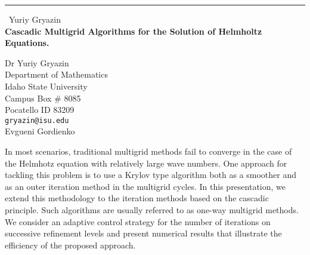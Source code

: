 \documentclass{report}
\begin{document}
\begin{center}
\rule{6in}{1pt} \
{\large Yuriy Gryazin \\
{\bf Cascadic Multigrid Algorithms for the Solution of Helmholtz Equations.}}

Dr Yuriy Gryazin \\ Department of Mathematics \\ Idaho State University \\ Campus Box # 8085 \\ Pocatello ID 83209
\\
{\tt gryazin@isu.edu}\\
Evgueni  Gordienko\end{center}

In most scenarios, traditional multigrid methods fail to converge in the
case of the Helmhotz equation with relatively large wave numbers. One
approach for tackling this problem is to use a Krylov type algorithm both
as a smoother and as an outer iteration method in the multigrid cycles.
In this presentation, we extend this methodology to the iteration methods
based on the cascadic principle. Such algorithms are usually referred to
as one-way multigrid methods. We consider an adaptive control strategy
for the number of iterations on successive refinement levels and present
numerical results that illustrate the efficiency of the proposed
approach.
\end{document}
